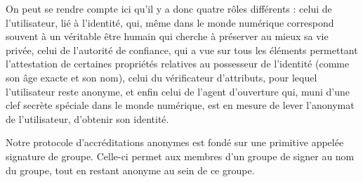 
On peut se rendre compte ici qu’il y a donc quatre rôles différents : celui de l’utilisateur, lié à l’identité, qui, même dans le monde numérique correspond souvent à un véritable être humain qui cherche à préserver au mieux sa vie privée, celui de l’autorité de confiance, qui a vue sur tous les éléments permettant l’attestation de certaines propriétés relatives au possesseur de l’identité (comme son âge exacte et son nom), celui du vérificateur d’attributs, pour lequel l’utilisateur reste anonyme, et enfin celui de l’agent d’ouverture qui, muni d’une clef secrète spéciale dans le monde numérique, est en mesure de lever l’anonymat de l’utilisateur, d’obtenir son identité.\par
Notre protocole d’accréditations anonymes est fondé sur une primitive appelée signature de groupe. Celle-ci permet aux membres d’un groupe de signer au nom du groupe, tout en restant anonyme au sein de ce groupe.\par 





\label{sec:accreditations}



